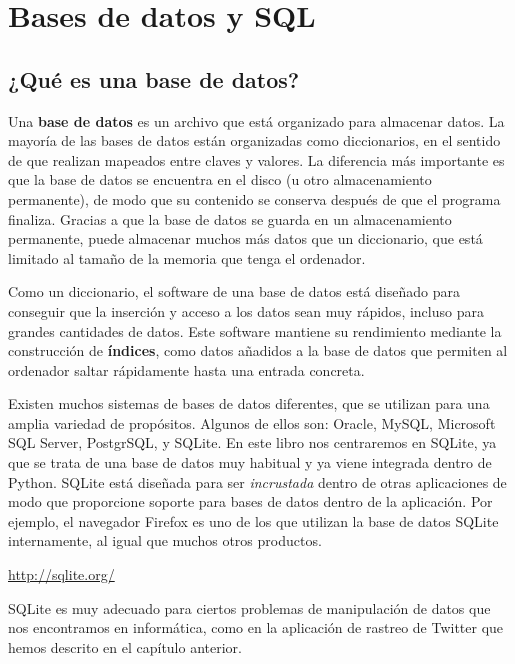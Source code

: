 
\chapter{Bases de datos y SQL}

\section{¿Qué es una base de datos?}

Una {\bf base de datos} es un archivo que está organizado para almacenar datos.
La mayoría de las bases de datos están organizadas como diccionarios, en el sentido
de que realizan mapeados entre claves y valores. La diferencia más importante
es que la base de datos se encuentra en el disco (u otro almacenamiento permanente),
de modo que su contenido se conserva después de que el programa finaliza. Gracias a que la base de
datos se guarda en un almacenamiento permanente, puede almacenar muchos más datos que
un diccionario, que está limitado al tamaño de la memoria
que tenga el ordenador.

Como un diccionario, el software de una base de datos está diseñado para conseguir que
la inserción y acceso a los datos sean muy rápidos, incluso para grandes
cantidades de datos. Este software mantiene su rendimiento mediante la
construcción de {\bf índices}, como datos añadidos a la base de datos
que permiten al ordenador saltar rápidamente hasta una entrada
concreta.

Existen muchos sistemas de bases de datos diferentes, que se utilizan para una
amplia variedad de propósitos. Algunos de ellos son: Oracle, MySQL, Microsoft SQL Server,
PostgrSQL, y SQLite. En este libro nos centraremos en SQLite, ya que
se trata de una base de datos muy habitual y ya viene integrada dentro de Python.
SQLite está diseñada para ser \emph{incrustada} dentro de otras aplicaciones
de modo que proporcione soporte para bases de datos dentro de la aplicación. Por ejemplo,
el navegador Firefox es uno de los que utilizan la base de datos SQLite internamente,
al igual que muchos otros productos.

\url{http://sqlite.org/}

SQLite es muy adecuado para ciertos problemas de manipulación de datos que nos
encontramos en informática, como en la aplicación de rastreo de Twitter que
hemos descrito en el capítulo anterior.

